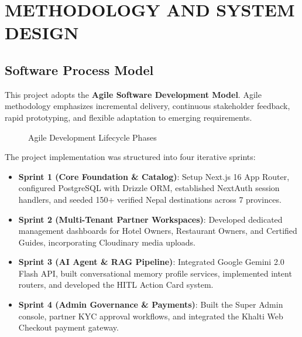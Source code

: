 \documentclass[12pt,a4paper]{report}
\begin{document}
\chapter{METHODOLOGY AND SYSTEM DESIGN}

\section{Software Process Model}
This project adopts the \textbf{Agile Software Development Model}. Agile methodology emphasizes incremental delivery, continuous stakeholder feedback, rapid prototyping, and flexible adaptation to emerging requirements.

\begin{figure}[htbp]
\centering
{}
\caption{Agile Development Lifecycle Phases}
\label{fig:agile_detailed}
\end{figure}

The project implementation was structured into four iterative sprints:
\begin{itemize}
    \item \textbf{Sprint 1 (Core Foundation \& Catalog)}: Setup Next.js 16 App Router, configured PostgreSQL with Drizzle ORM, established NextAuth session handlers, and seeded 150+ verified Nepal destinations across 7 provinces.
    \item \textbf{Sprint 2 (Multi-Tenant Partner Workspaces)}: Developed dedicated management dashboards for Hotel Owners, Restaurant Owners, and Certified Guides, incorporating Cloudinary media uploads.
    \item \textbf{Sprint 3 (AI Agent \& RAG Pipeline)}: Integrated Google Gemini 2.0 Flash API, built conversational memory profile services, implemented intent routers, and developed the HITL Action Card system.
    \item \textbf{Sprint 4 (Admin Governance \& Payments)}: Built the Super Admin console, partner KYC approval workflows, and integrated the Khalti Web Checkout payment gateway.
\end{itemize}
\end{document}
